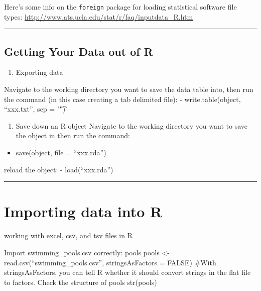 \documentclass[]{book}
\providecommand{\tightlist}{%
  \setlength{\itemsep}{0pt}\setlength{\parskip}{0pt}}
\begin{document}
Here's some info on the \texttt{foreign} package for loading statistical software file types: \url{http://www.ats.ucla.edu/stat/r/faq/inputdata_R.htm}

\begin{center}\rule{0.5\linewidth}{0.5pt}\end{center}

\hypertarget{getting-your-data-out-of-r}{%
\section{Getting Your Data out of R}\label{getting-your-data-out-of-r}}

\begin{enumerate}
\def\labelenumi{\arabic{enumi}.}
\tightlist
\item
  Exporting data
\end{enumerate}

Navigate to the working directory you want to save the data table into, then run the command (in this case creating a tab delimited file):
- write.table(object, ``xxx.txt'', sep = "\t")

\begin{enumerate}
\def\labelenumi{\arabic{enumi}.}
\setcounter{enumi}{1}
\tightlist
\item
  Save down an R object
  Navigate to the working directory you want to save the object in then run the command:
\end{enumerate}

\begin{itemize}
\tightlist
\item
  save(object, file = ``xxx.rda'')
\end{itemize}

reload the object:
- load(``xxx.rda'')

\begin{center}\rule{0.5\linewidth}{0.5pt}\end{center}

\hypertarget{importing-data-into-r}{%
\chapter{Importing data into R}\label{importing-data-into-r}}

working with excel, csv, and tsv files in R

Import swimming\_pools.csv correctly: pools
pools \textless{}- read.csv(``swimming\_pools.csv'', stringsAsFactors = FALSE)
\#With stringsAsFactors, you can tell R whether it should convert strings in the flat file to factors.
Check the structure of pools
str(pools)
\end{document}
